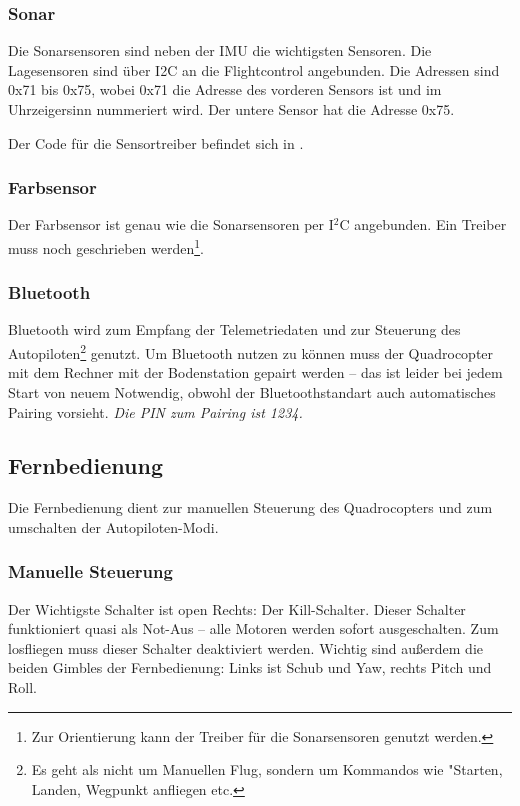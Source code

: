 \subsubsection{Sonar}
Die Sonarsensoren sind neben der IMU die wichtigsten Sensoren. Die Lagesensoren sind über I2C an die Flightcontrol angebunden.
Die Adressen sind 0x71 bis 0x75, wobei 0x71 die Adresse des vorderen Sensors ist und im Uhrzeigersinn nummeriert wird.
Der untere Sensor hat die Adresse 0x75.

Der Code für die Sensortreiber befindet sich in .

\subsubsection{Farbsensor}
Der Farbsensor ist genau wie die Sonarsensoren per I$^2$C angebunden. Ein Treiber muss noch geschrieben werden\footnote{Zur Orientierung kann der Treiber für die Sonarsensoren genutzt werden.}.


\subsubsection{Bluetooth}
Bluetooth wird zum Empfang der Telemetriedaten und zur Steuerung des Autopiloten\footnote{Es geht als nicht um Manuellen Flug, sondern um Kommandos wie "Starten, Landen, Wegpunkt anfliegen etc.} genutzt.
Um Bluetooth nutzen zu können muss der Quadrocopter mit dem Rechner mit der Bodenstation gepairt werden – das ist leider bei jedem Start von neuem Notwendig, obwohl der Bluetoothstandart auch automatisches Pairing vorsieht.
\emph{Die PIN zum Pairing ist 1234.}


\subsection{Fernbedienung}
Die Fernbedienung dient zur manuellen Steuerung des Quadrocopters und zum umschalten der Autopiloten-Modi.

\subsubsection{Manuelle Steuerung}
Der Wichtigste Schalter ist open Rechts: Der Kill-Schalter. Dieser Schalter funktioniert quasi als Not-Aus – alle Motoren werden sofort ausgeschalten.
Zum losfliegen muss dieser Schalter deaktiviert werden.
Wichtig sind außerdem die beiden Gimbles der Fernbedienung: Links ist Schub und Yaw, rechts Pitch und Roll.

